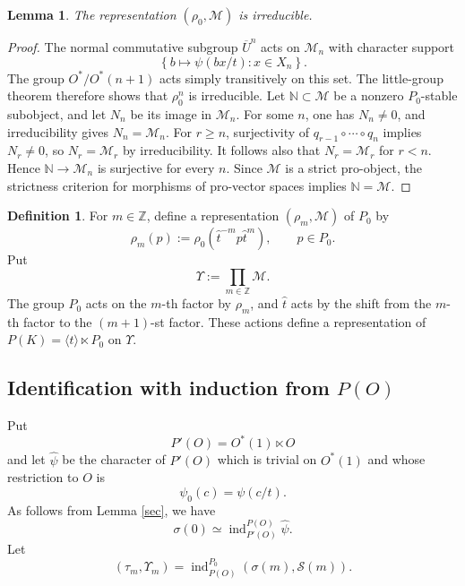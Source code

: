 \documentclass[11pt,a4paper,twoside]{amsart}
\newtheorem{lemma}[theorem]{Lemma}
\theoremstyle{definition}
\newtheorem{definition}[theorem]{Definition}
\theoremstyle{remark}
\newcommand{\mN}{\mathbb N}
\newcommand{\bs}{\sigma}
\newcommand{\mcM}{\mathcal M}
\newcommand{\mcS}{\mathcal S}
\newcommand{\ZZ}{\mathbb Z}
\newcommand{\ind}{\operatorname{ind}}
\begin{document}
\begin{lemma}\label{M-irred}
The representation $(\rho_0,\mcM)$ is irreducible.
\end{lemma}
\begin{proof}
The normal commutative subgroup $\overline U^n$ acts on $\mcM_n$ with character support
$$
\left\{b\longmapsto\psi(bx/t):x\in X_n\right\}.
$$
The group $O^*/O^*(n+1)$ acts simply transitively on this set. The little-group theorem therefore shows that $\rho_0^n$ is irreducible.
Let $\mN\subset\mcM$ be a nonzero $P_0$-stable subobject, and let $N_n$ be its image in $\mcM_n$. For some $n$, one has $N_n\neq0$, and irreducibility gives $N_n=\mcM_n$. For $r\geq n$, surjectivity of $q_{r-1}\circ\cdots\circ q_n$ implies $N_r\neq0$, so $N_r=\mcM_r$ by irreducibility. It follows also that $N_r=\mcM_r$ for $r<n$. Hence $\mN\to\mcM_n$ is surjective for every $n$. Since $\mcM$ is a strict pro-object, the strictness criterion for morphisms of pro-vector spaces implies $\mN=\mcM$.
\end{proof}
\begin{definition}
For $m\in\ZZ$, define a representation $(\rho_m,\mcM)$ of $P_0$ by
$$
\rho_m(p):=\rho_0(\widehat t^{-m}p\widehat t^m),\qquad p\in P_0.
$$
Put
$$
\Upsilon:=\prod_{m\in\ZZ}\mcM.
$$
The group $P_0$ acts on the $m$-th factor by $\rho_m$, and $\widehat t$ acts by the shift from the $m$-th factor to the $(m+1)$-st factor. These actions define a representation of $P(K)=\langle\widehat t\rangle\ltimes P_0$ on $\Upsilon$.
\end{definition}

\subsection{Identification with induction from $P(O)$}
Put
$$
P'(O)=O^*(1)\ltimes O
$$
and let $\widehat\psi$ be the character of $P'(O)$ which is trivial on $O^*(1)$ and whose restriction to $O$ is
$$
\psi_0(c)=\psi(c/t).
$$
As follows from Lemma \ref{sec}, we have
$$
\bs(0)\simeq\ind_{P'(O)}^{P(O)}\widehat\psi.
$$
Let
$$
(\tau_m,\Upsilon_m)=\ind_{P(O)}^{P_0}(\bs(m),\mcS(m)).
$$
\end{document}
